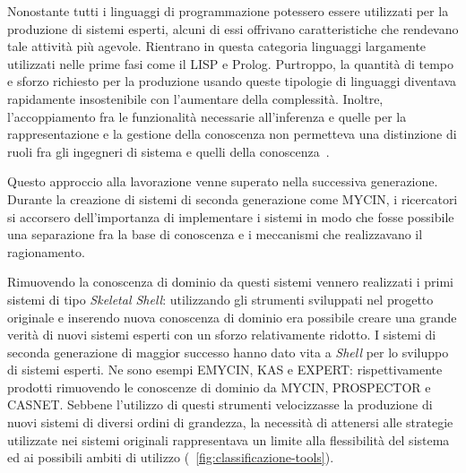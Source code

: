 Nonostante tutti i linguaggi di programmazione potessero essere utilizzati per la produzione di sistemi esperti, alcuni di essi offrivano caratteristiche che rendevano tale attività più agevole. Rientrano in questa categoria linguaggi largamente utilizzati nelle prime fasi come il LISP e Prolog.
Purtroppo, la quantità di tempo e sforzo richiesto per la produzione usando queste tipologie di linguaggi diventava rapidamente insostenibile con l'aumentare della complessità. Inoltre, l'accoppiamento fra le funzionalità necessarie all'inferenza e quelle per la rappresentazione e la gestione della conoscenza non permetteva una distinzione di ruoli fra gli ingegneri di sistema e quelli della conoscenza~\cite{development1993}.

Questo approccio alla lavorazione venne superato nella successiva generazione. Durante la creazione di sistemi di seconda generazione come MYCIN, i ricercatori si accorsero dell'importanza di implementare i sistemi in modo che fosse possibile una separazione fra la base di conoscenza e i meccanismi che realizzavano il ragionamento.

Rimuovendo la conoscenza di dominio da questi sistemi vennero realizzati i primi sistemi di tipo \emph{Skeletal Shell}: utilizzando gli strumenti sviluppati nel progetto originale e inserendo nuova conoscenza di dominio era possibile creare una grande verità di nuovi sistemi esperti con un sforzo relativamente ridotto. I sistemi di seconda generazione di maggior successo hanno dato vita a \emph{Shell} per lo sviluppo di sistemi esperti. Ne sono esempi EMYCIN, KAS e EXPERT: rispettivamente prodotti rimuovendo le conoscenze di dominio da MYCIN, PROSPECTOR e CASNET.
Sebbene l'utilizzo di questi strumenti velocizzasse la produzione di nuovi sistemi di diversi ordini di grandezza, la necessità di attenersi alle strategie utilizzate nei sistemi originali rappresentava un limite alla flessibilità del sistema ed ai possibili ambiti di utilizzo (\figurename~\ref{fig:classificazione-tools}). 

